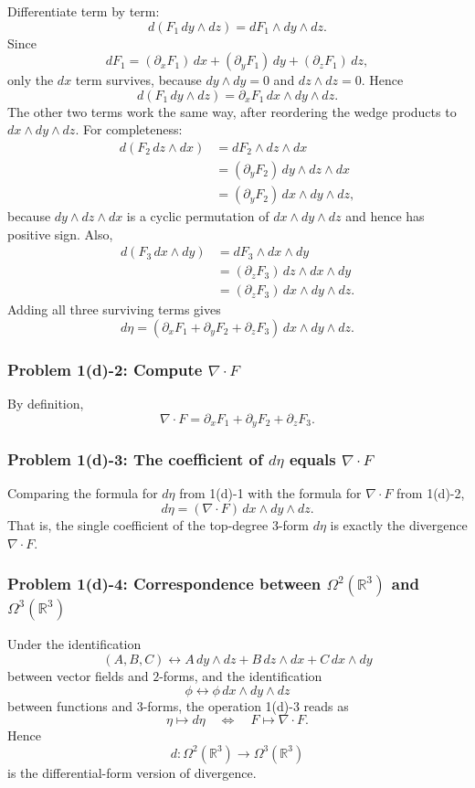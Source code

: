 \documentclass[11pt]{article}
\newcommand{\R}{\mathbb{R}}
\newcommand{\pd}{\partial}
\newcommand{\Om}{\Omega}
\begin{document}
Differentiate term by term:
\[
 d(F_1\,dy\wedge dz)=dF_1\wedge dy\wedge dz.
\]
Since
\[
 dF_1=(\pd_xF_1)\,dx+(\pd_yF_1)\,dy+(\pd_zF_1)\,dz,
\]
only the $dx$ term survives, because $dy\wedge dy=0$ and $dz\wedge dz=0$. Hence
\[
 d(F_1\,dy\wedge dz)=\pd_xF_1\,dx\wedge dy\wedge dz.
\]
The other two terms work the same way, after reordering the wedge products to $dx\wedge dy\wedge dz$. For completeness:
\[
\begin{aligned}
 d(F_2\,dz\wedge dx)
 &=dF_2\wedge dz\wedge dx\\
 &=(\pd_yF_2)\,dy\wedge dz\wedge dx\\
 &=(\pd_yF_2)\,dx\wedge dy\wedge dz,
\end{aligned}
\]
because $dy\wedge dz\wedge dx$ is a cyclic permutation of $dx\wedge dy\wedge dz$ and hence has positive sign. Also,
\[
\begin{aligned}
 d(F_3\,dx\wedge dy)
 &=dF_3\wedge dx\wedge dy\\
 &=(\pd_zF_3)\,dz\wedge dx\wedge dy\\
 &=(\pd_zF_3)\,dx\wedge dy\wedge dz.
\end{aligned}
\]
Adding all three surviving terms gives
\[
 d\eta
 =
 (\pd_xF_1+\pd_yF_2+\pd_zF_3)\,dx\wedge dy\wedge dz.
\]

\subsubsection*{Problem 1(d)-2: Compute $\nabla\cdot F$}

By definition,
\[
 \nabla\cdot F=\pd_xF_1+\pd_yF_2+\pd_zF_3.
\]

\subsubsection*{Problem 1(d)-3: The coefficient of $d\eta$ equals $\nabla\cdot F$}

Comparing the formula for $d\eta$ from 1(d)-1 with the formula for $\nabla\cdot F$ from 1(d)-2,
\[
 d\eta=(\nabla\cdot F)\,dx\wedge dy\wedge dz.
\]
That is, the single coefficient of the top-degree $3$-form $d\eta$ is exactly the divergence $\nabla\cdot F$.

\subsubsection*{Problem 1(d)-4: Correspondence between $\Omega^2(\R^3)$ and $\Omega^3(\R^3)$}

Under the identification
\[
 (A,B,C)\longleftrightarrow A\,dy\wedge dz+B\,dz\wedge dx+C\,dx\wedge dy
\]
between vector fields and $2$-forms, and the identification
\[
 \phi\longleftrightarrow \phi\,dx\wedge dy\wedge dz
\]
between functions and $3$-forms, the operation 1(d)-3 reads as
\[
 \eta\longmapsto d\eta\quad\Longleftrightarrow\quad F\longmapsto \nabla\cdot F.
\]
Hence
\[
 d:\Om^2(\R^3)\longrightarrow \Om^3(\R^3)
\]
is the differential-form version of divergence.
\end{document}

